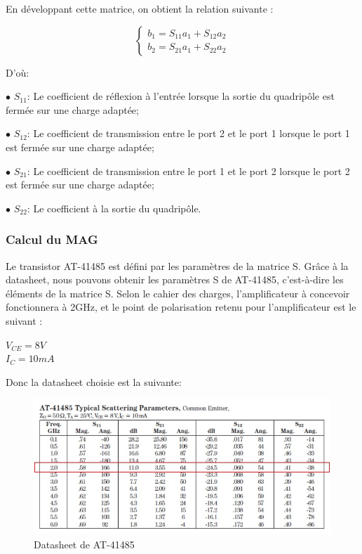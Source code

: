 \documentclass[french]{article}
\begin{document}
En développant cette matrice, on obtient la relation suivante :

\begin{equation}
	\left\{\begin{matrix}
		b_{1}=S_{11}a_{1}+S_{12}a_{2}\\
		b_{2}=S_{21}a_{1}+S_{22}a_{2}
	\end{matrix}\right.
	\label{eqmatrix}
\end{equation}

D’où:

$\bullet$ $S_{11}$: Le coefficient de réflexion à l’entrée lorsque la sortie du quadripôle est fermée sur une charge adaptée;

$\bullet$ $S_{12}$: Le coefficient de transmission entre le port 2 et le port 1 lorsque le port 1 est fermée sur une charge adaptée;

$\bullet$ $S_{21}$: Le coefficient de transmission entre le port 1 et le port 2 lorsque le port 2 est fermée sur une charge adaptée;

$\bullet$ $S_{22}$: Le coefficient à la sortie du quadripôle.

\subsubsection{Calcul du MAG}

Le transistor AT-41485 est défini par les paramètres de la matrice S. Grâce à la datasheet, nous pouvons obtenir les paramètres S de AT-41485, c'est-à-dire les éléments de la matrice S. Selon le cahier des charges, l'amplificateur à concevoir fonctionnera à 2GHz, et le point de polarisation retenu pour l’amplificateur est le suivant :

{\centering
	$V_{CE}=8V$\\
	$I_{C}=10mA$\\
}

Donc la datasheet choisie est la suivante: 
\begin{figure}[H]
	\centering
	\includegraphics[width=0.9\linewidth]{../5SynthAmp/Datasheet_AT41485}
	\caption{Datasheet de AT-41485}
	\label{fig:datasheet_AT}
\end{figure}
\end{document}
